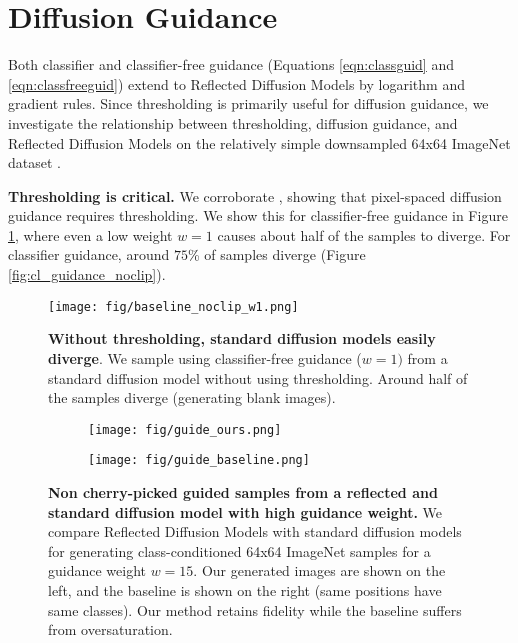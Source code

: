 \documentclass{article}
\theoremstyle{plain}
\theoremstyle{definition}
\theoremstyle{remark}
\begin{document}
  \section{Diffusion Guidance}

Both classifier and classifier-free guidance (Equations \ref{eqn:classguid} and \ref{eqn:classfreeguid}) extend to Reflected Diffusion Models by logarithm and gradient rules. Since thresholding is primarily useful for diffusion guidance, we investigate the relationship between thresholding, diffusion guidance, and Reflected Diffusion Models on the relatively simple downsampled 64x64 ImageNet dataset \citep{Russakovsky2014ImageNetLS}.

\textbf{Thresholding is critical.} We corroborate \citet{Saharia2022PhotorealisticTD}, showing that pixel-spaced diffusion guidance requires thresholding. We show this for classifier-free guidance in Figure \ref{fig:noclip}, where even a low weight $w=1$ causes about half of the samples to diverge. For classifier guidance, around $75$\% of samples diverge (Figure \ref{fig:cl_guidance_noclip}).

\begin{figure}[t]
    \centering
    \texttt{[image: fig/baseline\_noclip\_w1.png]}
    \caption{\textbf{Without thresholding, standard diffusion models easily diverge}. We sample using classifier-free guidance ($w=1)$ from a standard diffusion model without using thresholding. Around half of the samples diverge (generating blank images).}\label{fig:noclip}
    \vspace{-5mm}
\end{figure}

\begin{figure*}[!h]
    \centering
    \begin{subfigure}[b]{0.48\textwidth}
        \texttt{[image: fig/guide\_ours.png]}
    \end{subfigure}
    \hfill
    \begin{subfigure}[b]{0.48\textwidth}
        \texttt{[image: fig/guide\_baseline.png]}
    \end{subfigure}
    \caption{\textbf{Non cherry-picked guided samples from a reflected and standard diffusion model with high guidance weight.} We compare Reflected Diffusion Models with standard diffusion models for generating class-conditioned 64x64 ImageNet samples for a guidance weight $w=15$. Our generated images are shown on the left, and the baseline is shown on the right (same positions have same classes). Our method retains fidelity while the baseline suffers from oversaturation.}\label{fig:diffguide}
\end{figure*}
\end{document}

